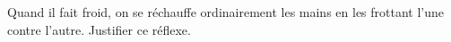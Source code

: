 Quand il fait froid, on se réchauffe ordinairement les mains en les frottant
l'une contre l'autre. Justifier ce réflexe.
